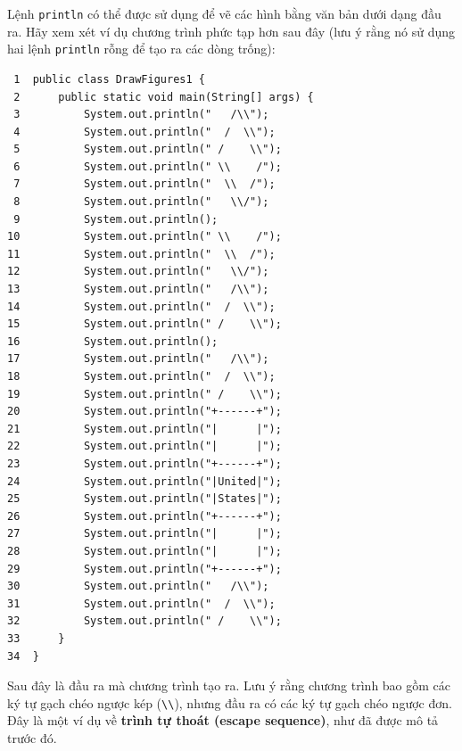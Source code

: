 Lệnh \texttt{println} có thể được sử dụng để vẽ các hình bằng văn bản
dưới dạng đầu ra. Hãy xem xét ví dụ chương trình phức tạp hơn sau đây
(lưu ý rằng nó sử dụng hai lệnh \texttt{println} rỗng để tạo ra các dòng
trống):

\begin{verbatim}
 1  public class DrawFigures1 {
 2      public static void main(String[] args) {
 3          System.out.println("   /\\");
 4          System.out.println("  /  \\");
 5          System.out.println(" /    \\");
 6          System.out.println(" \\    /");
 7          System.out.println("  \\  /");
 8          System.out.println("   \\/");
 9          System.out.println();
10          System.out.println(" \\    /");
11          System.out.println("  \\  /");
12          System.out.println("   \\/");
13          System.out.println("   /\\");
14          System.out.println("  /  \\");
15          System.out.println(" /    \\");
16          System.out.println();
17          System.out.println("   /\\");
18          System.out.println("  /  \\");
19          System.out.println(" /    \\");
20          System.out.println("+------+");
21          System.out.println("|      |");
22          System.out.println("|      |");
23          System.out.println("+------+");
24          System.out.println("|United|");
25          System.out.println("|States|");
26          System.out.println("+------+");
27          System.out.println("|      |");
28          System.out.println("|      |");
29          System.out.println("+------+");
30          System.out.println("   /\\");
31          System.out.println("  /  \\");
32          System.out.println(" /    \\");
33      }
34  }
\end{verbatim}

Sau đây là đầu ra mà chương trình tạo ra. Lưu ý rằng chương trình bao
gồm các ký tự gạch chéo ngược kép
(\texttt{\textbackslash{}\textbackslash{}}), nhưng đầu ra có các ký tự
gạch chéo ngược đơn. Đây là một ví dụ về \textbf{trình tự thoát (escape
sequence)}, như đã được mô tả trước đó.

